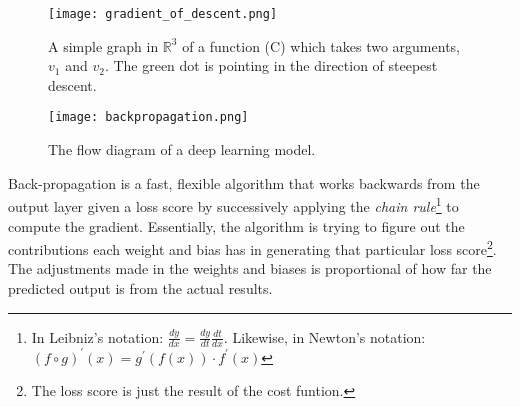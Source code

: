 \documentclass[12pt]{article}
\begin{document}
\begin{figure}[h]
    \centering
    \texttt{[image: gradient\_of\_descent.png]}     
    \caption{A simple graph  in $\mathbb{R}^3$ of a function (C) which takes two arguments, $v_1$ and $v_2$. The green dot is pointing in the direction of steepest descent\cite{nielsen2015NN}.}
\end{figure}
\newpage

\begin{figure}[h]
    \centering
    \texttt{[image: backpropagation.png]}
    \caption{The flow diagram of a deep learning model\cite{pythondeeplearning}.}
    \label{fig:my_label}
\end{figure}

Back-propagation is a fast, flexible algorithm that works backwards from the output layer given a loss score by successively applying the \textit{chain rule}\footnote{In Leibniz's notation: $\frac{dy}{dx}=\frac{dy}{dt}\frac{dt}{dx}$. Likewise, in Newton's notation: $(f\circ g)^{'}(x) = g^{'}(f(x))\cdot f^{'}(x)$} \cite{goodfellow2016deep} to compute the gradient. Essentially, the algorithm is trying to figure out the contributions each weight and bias has in generating that particular loss score\footnote{The loss score is just the result of the cost funtion.}. The adjustments made in the weights and biases is proportional of how far the predicted output is from the actual results\cite{3blue1brown}.  


\newpage



\end{document}
